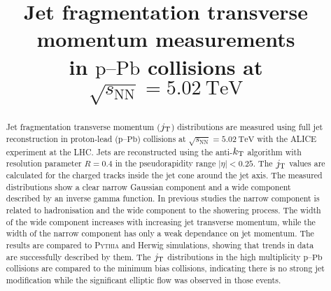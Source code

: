 \documentclass[ALICE,manyauthors]{cernphprep}
\newcommand{\pPb}{\ensuremath{\mbox{p--Pb}}}
\newcommand{\sqrtSnn}{\ensuremath{\sqrt{s_{\mathrm{NN}}}}}
\newcommand{\sqrtSnnE}[2][TeV]{\ensuremath{\sqrtSnn = #2~\mathrm{#1}}}
\def\jt#1{\ensuremath{j_{\rm T#1}}}
\def\kt#1{\ensuremath{k_{\rm T#1}}}
\begin{document}
\begin{titlepage}
%
%

\title{Jet fragmentation transverse momentum measurements \\ in $\pPb$ collisions at $\sqrtSnnE{5.02}$}


\begin{abstract}
Jet fragmentation transverse momentum ($\jt{}$) distributions are measured using full jet reconstruction in proton-lead (\pPb) collisions at $\sqrtSnnE{5.02}$ with the ALICE experiment at the LHC. Jets are reconstructed using the anti-$\kt{}$ algorithm with resolution parameter $R=0.4$ in the pseudorapidity range $|\eta|<0.25$. The $\jt{}$ values are calculated for the charged tracks inside the jet cone around the jet axis. The measured distributions show a clear narrow Gaussian component and a wide component described by an inverse gamma function. In previous studies the narrow component is related to hadronisation and the wide component to the showering process. The width of the wide component increases with increasing jet transverse momentum, while the width of the narrow component has only a weak dependance on jet momentum. The results are compared to \textsc{Pythia} and Herwig simulations, showing that trends in data are successfully described by them. The $\jt{}$ distributions in the high multiplicity $\pPb$ collisions are compared to the minimum bias collisions, indicating there is no strong jet modification while the significant elliptic flow was observed in those events.
\end{abstract}
\end{titlepage}
\setcounter{page}{2}




\newpage
\end{document}

